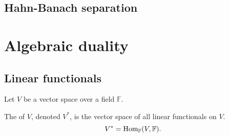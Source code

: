\subsection{Hahn-Banach separation}



\section{Algebraic duality}
\subsection{Linear functionals}
\begin{definition}
Let $V$ be a vector space over a field $\mathbb{F}$.

The  of $V$, denoted $V^*$, is the vector space of all linear functionals on $V$.
\[ V^* = \operatorname{Hom}_{\mathbb{F}}(V,\mathbb{F}). \]
\end{definition}

